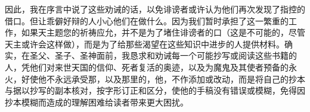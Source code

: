 因此，我在序言中说了这些劝诫的话，以免诽谤者或许认为他们再次发现了指控的借口。但让乖僻好辩的人小心他们在做什么。因为我们暂时承担了这一繁重的工作，如果天主题您的祈祷应允，并不是为了堵住诽谤者的口（这是不可能的，尽管天主或许会这样做），而是为了给那些渴望在这些知识中进步的人提供材料。确实，在圣父、圣子、圣神面前，我恳求和劝诫每一个可能抄写或阅读这些书籍的人，凭他们对来世天国的信仰、死者复活的奥迹，以及为魔鬼及其使者预备的永火，好使他不永远承受那，以及那里的，他，不作添加或改动，而是将自己的抄本与据以抄写的副本核对，按字形订正和区分，使他的手稿没有错误或模糊，免得因抄本模糊而造成的理解困难给读者带来更大困扰。\par

